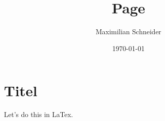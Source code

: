\documentclass[12pt]{article}
\title{Page}
\author{Maximilian Schneider}
\date{\today}
\begin{document}
\section*{Titel}
Let's do this in LaTex.
\end{document}
